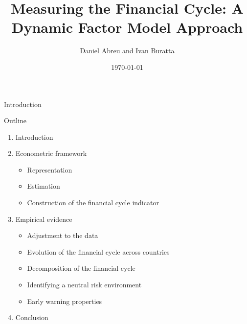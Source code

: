 \documentclass{beamer}
\title[Project Presentation]{Measuring the Financial Cycle: A Dynamic
Factor Model Approach}
\author{Daniel Abreu and Ivan Buratta}
\institute{}
\date{\today}
\begin{document}
\begin{frame}
  \titlepage
\end{frame}



\begin{frame}{Introduction}

    \begin{block}{Outline}
    
    \vspace{0.25 cm}
    
    \begin{enumerate}
    
    \item Introduction
    
    \item Econometric framework

    \begin{itemize}
        \item Representation
        \item Estimation
        \item Construction of the financial cycle indicator
    \end{itemize}
    
    \item Empirical evidence

    \begin{itemize}
        \item Adjustment to the data
        \item Evolution of the financial cycle across countries
        \item Decomposition of the financial cycle
        \item Identifying a neutral risk environment
        \item Early warning properties
        
    \end{itemize}


        \item Conclusion

    \end{enumerate}  
    
    \end{block}
    
\end{frame}{}
\end{document}
